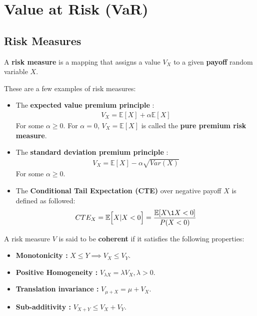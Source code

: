 \newpage 
\section{Value at Risk (VaR)}

\subsection{Risk Measures}
\begin{definition}
    A \textbf{risk measure} is a mapping that assigns a value $V_X$ to a given \textbf{payoff} random variable $X$.
\end{definition}

\noindent\newline These are a few examples of risk measures:
\begin{itemize}
    \item The \textbf{expected value premium principle} : 
    \begin{align*}
        V_X=\mathbb{E}[X] + \alpha\mathbb{E}[X]
    \end{align*}
    \noindent For some $\alpha\ge0$. For $\alpha=0$, $V_X=\mathbb{E}[X]$ is called the \textbf{pure premium risk measure}.

    \item The \textbf{standard deviation premium principle} : 
    \begin{align*}
        V_X = \mathbb{E}[X] - \alpha\sqrt{Var(X)}
    \end{align*}
    \noindent For some $\alpha\ge0$.

    \item The \textbf{Conditional Tail Expectation (CTE)} over negative payoff $X$ is defined as followed:
    \begin{align*}
        CTE_X = \mathbb{E}\Big[ X|X<0 \Big] = \frac{\mathbb{E}[X\1{X<0}]}{P(X<0)}
    \end{align*}
\end{itemize}

\begin{definition}
    A risk measure $V$ is said to be \textbf{coherent} if it satisfies the following properties:
    \begin{itemize}
        \item \textbf{Monotonicity : } $X \le Y\implies V_X \le V_Y$.
        \item \textbf{Positive Homogeneity : } $V_{\lambda X} = \lambda V_X, \lambda > 0$.
        \item \textbf{Translation invariance : } $V_{\mu + X} = \mu + V_X$.
        \item \textbf{Sub-additivity : } $V_{X+Y} \le V_X + V_Y$.
    \end{itemize}
\end{definition}

